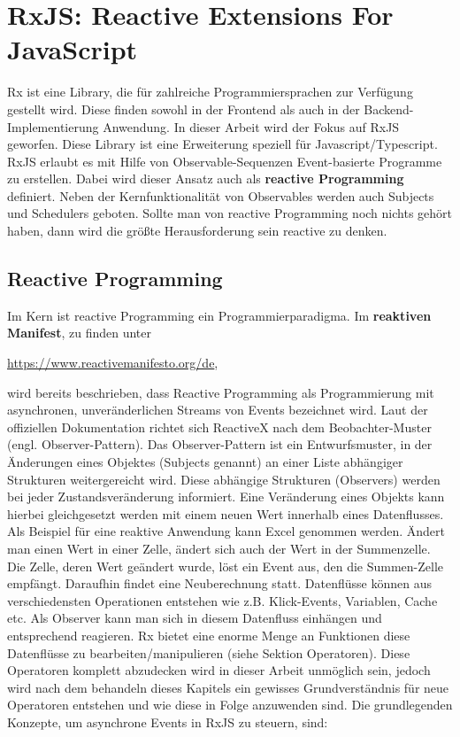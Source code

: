 \section{RxJS: Reactive Extensions For JavaScript}

Rx ist eine Library, die für zahlreiche Programmiersprachen zur Verfügung gestellt wird. Diese finden sowohl in der Frontend als auch in der Backend-Implementierung Anwendung. In dieser Arbeit wird der Fokus auf RxJS geworfen. Diese Library ist eine Erweiterung speziell für Javascript/Typescript. RxJS erlaubt es mit Hilfe von Observable-Sequenzen Event-basierte Programme zu erstellen. Dabei wird dieser Ansatz auch als \textbf{reactive Programming} definiert. Neben der Kernfunktionalität von Observables werden auch Subjects und Schedulers geboten. Sollte man von reactive Programming noch nichts gehört haben, dann wird die größte Herausforderung sein \glqq{}reactive\grqq{} zu denken.

\subsection{Reactive Programming}
Im Kern ist reactive Programming ein Programmierparadigma. Im \textbf{reaktiven Manifest}, zu finden unter

\begin{center}
\url{https://www.reactivemanifesto.org/de},
\end{center}

\noindent
wird bereits beschrieben, dass Reactive Programming als Programmierung mit asynchronen, unveränderlichen Streams von Events bezeichnet wird. Laut der offiziellen Dokumentation richtet sich ReactiveX nach dem Beobachter-Muster (engl. Observer-Pattern). Das Observer-Pattern ist ein Entwurfsmuster, in der Änderungen eines Objektes (Subjects genannt) an einer Liste abhängiger Strukturen weitergereicht wird. Diese abhängige Strukturen (Observers) werden bei jeder Zustandsveränderung informiert. Eine Veränderung eines Objekts kann hierbei gleichgesetzt werden mit einem neuen Wert innerhalb eines Datenflusses. Als Beispiel für eine reaktive Anwendung kann Excel genommen werden. Ändert man einen Wert in einer Zelle, ändert sich auch der Wert in der Summenzelle. Die Zelle, deren Wert geändert wurde, löst ein Event aus, den die Summen-Zelle empfängt. Daraufhin findet eine Neuberechnung statt.\cite{reactive-programming-beispiel} Datenflüsse können aus verschiedensten Operationen entstehen wie z.B. Klick-Events, Variablen, Cache etc. Als Observer kann man sich in diesem Datenfluss einhängen und entsprechend reagieren.\cite{rx-intro} Rx bietet eine enorme Menge an Funktionen diese Datenflüsse zu bearbeiten/manipulieren (siehe Sektion Operatoren). Diese Operatoren komplett abzudecken wird in dieser Arbeit unmöglich sein, jedoch wird nach dem behandeln dieses Kapitels ein gewisses Grundverständnis für neue Operatoren entstehen und wie diese in Folge anzuwenden sind. Die grundlegenden Konzepte, um asynchrone Events in RxJS zu steuern, sind:

